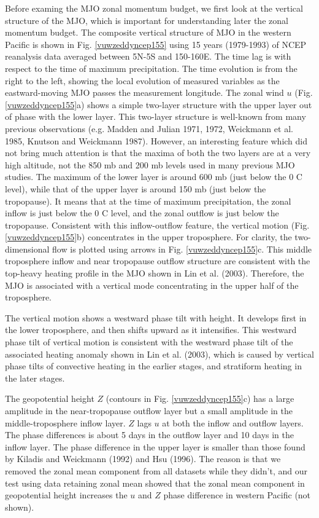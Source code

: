 \documentclass[12pt]{article}
\begin{document}
  Before examing the MJO zonal momentum budget, we first look at the
vertical structure of the MJO, which is important for
understanding later the zonal momentum budget.
The composite vertical structure of MJO in the western Pacific is shown in 
Fig. \ref{vuwzeddyncep155} using 15 years (1979-1993) of NCEP reanalysis 
data averaged between 5N-5S and 150-160E. The time lag is with respect
to the time of maximum precipitation.  The time evolution is from the
right to the left, showing the local evolution of measured variables
as the eastward-moving MJO passes the measurement longitude.  The
zonal wind $u$ (Fig. \ref{vuwzeddyncep155}a) shows a simple two-layer 
structure with the upper layer out of phase with the lower layer.
This two-layer structure is well-known from many previous observations
(e.g. Madden and Julian 1971, 1972, Weickmann et al. 1985, Knutson
and Weickmann 1987).  However, an interesting feature which
did not bring much attention is that the maxima of both the two layers
are at a very high altitude, not the 850 mb and 200 mb levels used in
many previous MJO studies.  The maximum of the lower layer is around
600 mb (just below the 0 C level), while that of the upper layer is
around 150 mb (just below the tropopause).  It means that at the time
of maximum precipitation, the zonal inflow is just below the 0 C
level, and the zonal outflow is just below the tropopause.
Consistent with this inflow-outflow feature, the vertical motion
(Fig. \ref{vuwzeddyncep155}b) concentrates in the upper troposphere.  For
clarity, the two-dimensional flow is plotted using arrows in
Fig. \ref{vuwzeddyncep155}c.  This middle troposphere inflow and near
tropopause outflow structure are consistent with the top-heavy heating
profile in the MJO shown in Lin et al. (2003).
Therefore, the MJO is associated with a vertical mode concentrating in the
upper half of the troposphere.

  The vertical motion shows a westward phase tilt with height.  It
develops first in the lower troposphere, and then shifts upward as it
intensifies.  This westward phase tilt of vertical motion is
consistent with the westward phase tilt of the associated heating
anomaly shown in Lin et al. (2003), which is caused by vertical phase
tilts of convective heating in the earlier stages, and stratiform
heating in the later stages.

  The geopotential height $Z$ (contours in Fig. \ref{vuwzeddyncep155}c) 
has a large amplitude in the near-tropopause outflow layer but a small 
amplitude in the middle-troposphere inflow layer.
$Z$ lags $u$ at both the inflow and outflow layers.
The phase differences is about 5 days 
in the outflow layer and 10 days in the inflow layer. 
The phase difference in the upper layer is smaller than those found by
Kiladis and Weickmann (1992) and Hsu (1996). The reason is that we removed
the zonal mean component from all datasets while they didn't, and our
test using data retaining zonal mean showed that the
zonal mean component in geopotential height increases the $u$ and $Z$
phase difference in western Pacific (not shown).
\end{document}
